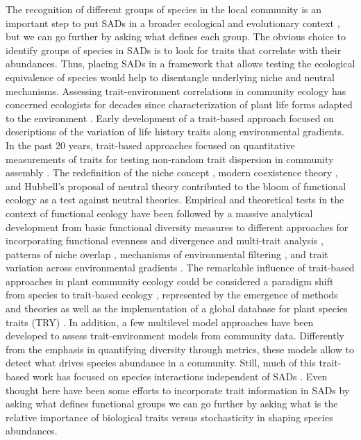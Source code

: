 \documentclass[12pt]{article}
\begin{document}
The recognition of different groups of species in the local community is an important step to put SADs in a broader ecological and evolutionary context \citep{McGill2007, Swenson2012}, but we can go further by asking what defines each group. The obvious choice to identify groups of species in SADs is to look for traits that correlate with their abundances.  Thus, placing SADs in a framework that allows testing the ecological equivalence of species would help to disentangle underlying niche and neutral mechanisms. Assessing trait-environment correlations in community ecology has concerned ecologists for decades since \cite{Raunkiaer1934} characterization of plant life forms adapted to the environment \citep[see also][]{Grime1977, Connell1978}. Early development of a trait-based approach focused on descriptions of the variation of life history traits along environmental gradients. In the past 20 years, trait-based approaches focused on quantitative measurements of traits for testing non-random trait dispersion in community assembly
\citep{Swenson2012}. The redefinition of the niche concept \citep{Chase2003}, modern coexistence theory \citep{Chesson2000}, and Hubbell's proposal of neutral theory \citep{Hubbell2001} contributed to the bloom of functional ecology as a test against neutral theories. Empirical and theoretical tests in the context of functional ecology have been followed by a massive analytical development \citep{Kraft2010} from basic functional diversity measures
\citep{Petchey2002a, Petchey2007} to different approaches for incorporating functional evenness and divergence \citep{Mason2005, Pavoine2009} and multi-trait analysis \citep{Laliberte2010}, patterns of niche overlap \citep{Mason2008}, mechanisms of environmental filtering \citep{Kraft2007, Mayfield2009}, and trait
variation across environmental gradients \citep{shipley2006plant, cornwell2009community, messier2010traits}. 
The remarkable influence of trait-based approaches in plant community ecology could be considered a paradigm shift from species to trait-based ecology \citep{Pavoine2011, Swenson2012}, represented by the emergence of methods and theories as well as the implementation of a global database for plant species traits (TRY) \citep{Kattage2011}.
In addition, a few multilevel model approaches \citep{Pollock2012, Jamil2013, Jamil2013a, Miller2019, TerBraak2019} have been developed to assess trait-environment models from community data. Differently from the emphasis in quantifying diversity through metrics, these models allow to detect what drives species abundance in a community. Still, much of this trait-based work has focused on species interactions independent of SADs \citep{Swenson2012}. 
Even thought here have been some efforts to incorporate trait information in SADs \citep{Magurran2003, Supp2015} by asking what defines functional groups we can go further by asking what is the relative importance of biological traits versus stochasticity in shaping species abundances. 
 
\end{document}
